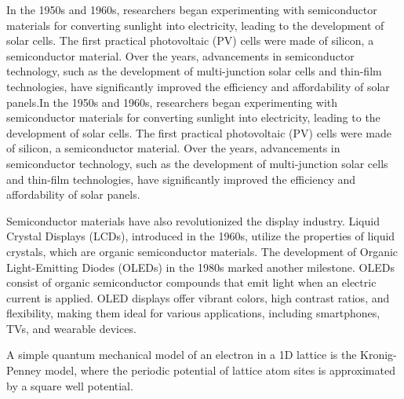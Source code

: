 
In the 1950s and 1960s, researchers began experimenting with semiconductor materials for converting sunlight into electricity, leading to the development of solar cells. The first practical photovoltaic (PV) cells were made of silicon, a semiconductor material. Over the years, advancements in semiconductor technology, such as the development of multi-junction solar cells and thin-film technologies, have significantly improved the efficiency and affordability of solar panels.In the 1950s and 1960s, researchers began experimenting with semiconductor materials for converting sunlight into electricity, leading to the development of solar cells. The first practical photovoltaic (PV) cells were made of silicon, a semiconductor material. Over the years, advancements in semiconductor technology, such as the development of multi-junction solar cells and thin-film technologies, have significantly improved the efficiency and affordability of solar panels.





Semiconductor materials have also revolutionized the display industry. Liquid Crystal Displays (LCDs), introduced in the 1960s, utilize the properties of liquid crystals, which are organic semiconductor materials. The development of Organic Light-Emitting Diodes (OLEDs) in the 1980s marked another milestone. OLEDs consist of organic semiconductor compounds that emit light when an electric current is applied. OLED displays offer vibrant colors, high contrast ratios, and flexibility, making them ideal for various applications, including smartphones, TVs, and wearable devices.






A simple quantum mechanical model of an electron in a 1D lattice is the Kronig-Penney model, where the periodic potential of lattice atom sites is approximated by a square well potential.


